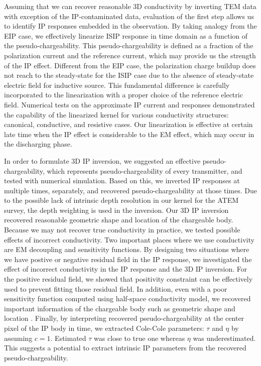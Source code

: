 \documentclass[a4paper, 11pt]{article}
\begin{document}
Assuming that we can recover reasonable 3D conductivity by inverting TEM data with exception of the IP-contaminated data, evaluation of the first step allows us to identify IP responses embedded in the observation. 
By taking analogy from the EIP case, we effectively linearize ISIP response in time domain as a function of the pseudo-chargeability. 
This pseudo-chargeability is defined as a fraction of the polarization current and the reference current, which may provide us the strength of the IP effect. 
Different from the EIP case, the polarization charge buildup does not reach to the steady-state for the ISIP case due to the absence of steady-state electric field for inductive source. 
This fundamental difference is carefully incorporated to the linearization with a proper choice of the reference electric field. 
Numerical tests on the approximate IP current and responses demonstrated the capability of the linearized kernel for various conductivity structures: canonical, conductive, and resistive cases. 
Our linearization is effective at certain late time when the IP effect is considerable to the EM effect, which may occur in the discharging phase. 

In order to formulate 3D IP inversion, we suggested an effective pseudo-chargeability, which represents pseudo-chargeability of every transmitter, and tested with numerical simulation. 
Based on this, we inverted IP responses at multiple times, separately, and recovered pseudo-chargeability at those times.
Due to the possible lack of intrinsic depth resolution in our kernel for the ATEM survey, the depth weighting is used in the inversion.  
Our 3D IP inversion recovered reasonable geometric shape and location of the chargeable body. 
Because we may not recover true conductivity in practice, we tested possible effects of incorrect conductivity. 
Two important places where we use conductivity are EM decoupling and sensitivity functions. 
By designing two situations where we have postive or negative residual field in the IP response, we investigated the effect of incorrect conductivity in the IP response and the 3D IP inversion. 
For the positive residual field, we showed that positivity constraint can be effectively used to prevent fitting those residual field. 
In addition, even with a poor sensitivity function computed using half-space conductivity model, we recovered important information of the chargeable body such as geometric shape and location . 
Finally, by interpreting recovered pseudo-chargeability at the center pixel of the IP body in time, we extracted Cole-Cole parameters: $\tau$ and $\eta$ by assuming $c=1$. 
Estimated $\tau$ was close to true one whereas $\eta$ was underestimated.
This suggests a potential to extract intrinsic IP parameters from the recovered pseudo-chargeability. 
\end{document}
